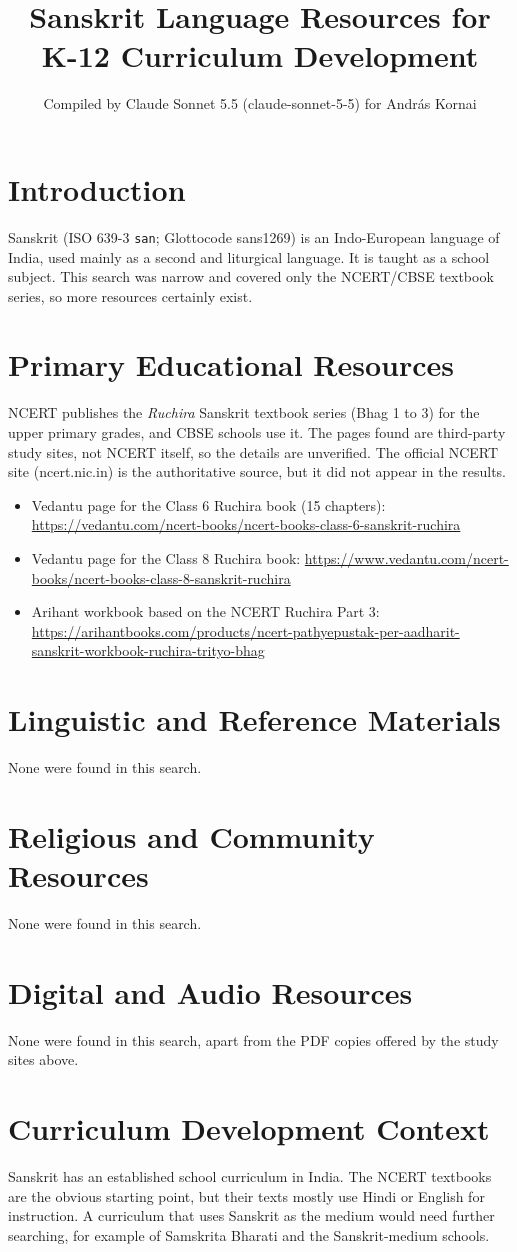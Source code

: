 \documentclass[12pt]{article}
\title{Sanskrit Language Resources for K-12 Curriculum Development}
\author{Compiled by Claude Sonnet 5.5 (claude-sonnet-5-5) for Andr\'as Kornai}
\date{}
\begin{document}
\maketitle

\section{Introduction}
Sanskrit (ISO 639-3 \texttt{san}; Glottocode sans1269) is an Indo-European language of India, used mainly as a second and liturgical language. It is taught as a school subject. This search was narrow and covered only the NCERT/CBSE textbook series, so more resources certainly exist.

\section{Primary Educational Resources}
NCERT publishes the \emph{Ruchira} Sanskrit textbook series (Bhag 1 to 3) for the upper primary grades, and CBSE schools use it. The pages found are third-party study sites, not NCERT itself, so the details are unverified. The official NCERT site (ncert.nic.in) is the authoritative source, but it did not appear in the results.
\begin{itemize}
\item Vedantu page for the Class 6 Ruchira book (15 chapters): \url{https://vedantu.com/ncert-books/ncert-books-class-6-sanskrit-ruchira}
\item Vedantu page for the Class 8 Ruchira book: \url{https://www.vedantu.com/ncert-books/ncert-books-class-8-sanskrit-ruchira}
\item Arihant workbook based on the NCERT Ruchira Part 3: \url{https://arihantbooks.com/products/ncert-pathyepustak-per-aadharit-sanskrit-workbook-ruchira-trityo-bhag}
\end{itemize}

\section{Linguistic and Reference Materials}
None were found in this search.

\section{Religious and Community Resources}
None were found in this search.

\section{Digital and Audio Resources}
None were found in this search, apart from the PDF copies offered by the study sites above.

\section{Curriculum Development Context}
Sanskrit has an established school curriculum in India. The NCERT textbooks are the obvious starting point, but their texts mostly use Hindi or English for instruction. A curriculum that uses Sanskrit as the medium would need further searching, for example of Samskrita Bharati and the Sanskrit-medium schools.
\end{document}
